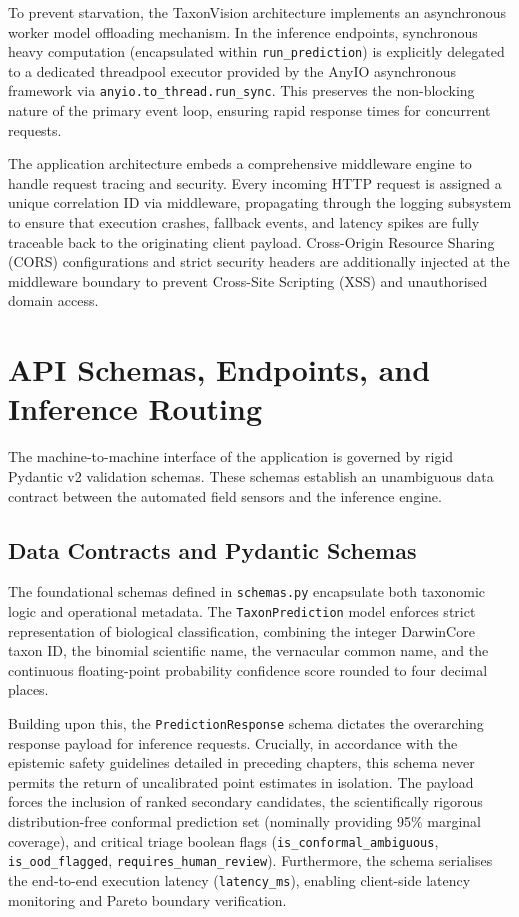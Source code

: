 To prevent starvation, the TaxonVision architecture implements an asynchronous worker model offloading mechanism. In the inference endpoints, synchronous heavy computation (encapsulated within \texttt{run\_prediction}) is explicitly delegated to a dedicated threadpool executor provided by the AnyIO asynchronous framework via \texttt{anyio.to\_thread.run\_sync}. This preserves the non-blocking nature of the primary event loop, ensuring rapid response times for concurrent requests.

The application architecture embeds a comprehensive middleware engine to handle request tracing and security. Every incoming HTTP request is assigned a unique correlation ID via middleware, propagating through the logging subsystem to ensure that execution crashes, fallback events, and latency spikes are fully traceable back to the originating client payload. Cross-Origin Resource Sharing (CORS) configurations and strict security headers are additionally injected at the middleware boundary to prevent Cross-Site Scripting (XSS) and unauthorised domain access.

\section{API Schemas, Endpoints, and Inference Routing}
\label{sec:api_schemas_and_endpoints}

The machine-to-machine interface of the application is governed by rigid Pydantic v2 validation schemas. These schemas establish an unambiguous data contract between the automated field sensors and the inference engine.

\subsection{Data Contracts and Pydantic Schemas}

The foundational schemas defined in \texttt{schemas.py} encapsulate both taxonomic logic and operational metadata. The \texttt{TaxonPrediction} model enforces strict representation of biological classification, combining the integer DarwinCore taxon ID, the binomial scientific name, the vernacular common name, and the continuous floating-point probability confidence score rounded to four decimal places.

Building upon this, the \texttt{PredictionResponse} schema dictates the overarching response payload for inference requests. Crucially, in accordance with the epistemic safety guidelines detailed in preceding chapters, this schema never permits the return of uncalibrated point estimates in isolation. The payload forces the inclusion of ranked secondary candidates, the scientifically rigorous distribution-free conformal prediction set (nominally providing 95\% marginal coverage), and critical triage boolean flags (\texttt{is\_conformal\_ambiguous}, \texttt{is\_ood\_flagged}, \texttt{requires\_human\_review}). Furthermore, the schema serialises the end-to-end execution latency (\texttt{latency\_ms}), enabling client-side latency monitoring and Pareto boundary verification.

